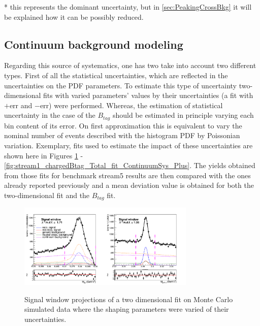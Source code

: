 * this represents the dominant uncertainty, but in \cref{sec:PeakingCrossBkg} it will be explained how it can be possibly reduced.


\subsection{Continuum background modeling}\label{sec:chargedCorr_continuumBkgSys}

Regarding this source of systematics, one has two take into account two different types. 
First of all the statistical uncertainties, which are reflected in the uncertainties on the PDF parameters. To estimate this type of uncertainty two-dimensional fits with varied parameters' values by their uncertainties (a fit with $+$err and $-$err) were performed. Whereas, the estimation of statistical uncertainty in the case of the $B_{tag}$ should be estimated in principle varying each bin content of its error. On first approximation this is equivalent to vary the nominal number of events described with the histogram PDF by Poissonian variation. 
Exemplary, fits used to estimate the impact of these uncertainties are shown here in Figures \ref{fig:Signal_window_Total_2DFit_stream5_free_sigmas_ContinuumSys_Plus} - \ref{fig:stream1_chargedBtag_Total_fit_ContinuumSys_Plus}.
The yields obtained from those fits for benchmark stream5 results are then compared with the ones already reported previously and a mean deviation value is obtained for both the two-dimensional fit and the $B_{tag}$ fit.

 

\begin{figure}[h!]
{\includegraphics[width=0.75\textwidth]{04-chargedCorrBtoLambda/figs/Signal_window_Total_2DFit_stream5_free_sigmas_Plus.png}}
\caption{Signal window projections of a two dimensional fit on Monte Carlo simulated data where the shaping parameters were varied of their uncertainties.}
\label{fig:Signal_window_Total_2DFit_stream5_free_sigmas_ContinuumSys_Plus}
\end{figure}

